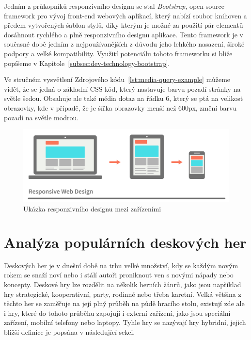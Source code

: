 Jedním z průkopníků responzivního designu se stal \textit{Bootstrap}, open-source framework pro vývoj front-end webových aplikací, který nabízí soubor knihoven a předem vytvořených šablon stylů, díky kterým je možné za použití pár elementů dosáhnout rychlého a plně responzivního designu aplikace. Tento framework je v současné době jedním z nejpoužívanějších z důvodu jeho lehkého nasazení, široké podpory a velké kompatibility. Využití potenciálu tohoto frameworku si blíže popíšeme v Kapitole~\ref{subsec:dev-technology-bootstrap}.



Ve stručném vysvětlení Zdrojového kódu~\ref{lst:media-query-example} můžeme vidět, že se jedná o základní CSS kód, který nastavuje barvu pozadí stránky na světle šedou. Obsahuje ale také média dotaz na řádku 6, který se ptá na velikost obrazovky, kde v případě, že je šířka obrazovky menší než 600px, změní barvu pozadí na světle modrou.

\begin{figure}[H]
    \centering
    \includegraphics[width=1.0\textwidth]{figures/responsiveDesign}
    \caption{Ukázka responzivního designu mezi zařízeními \cite{responsive_design}}
    \label{fig:responsive-design-example}
\end{figure}

\section{Analýza populárních deskových her}
\label{sec:popular-board-games-analysis}
Deskových her je v dnešní době na trhu velké množství, kdy se každým novým rokem se snaží noví nebo i stálí autoři proniknout ven s novými nápady nebo koncepty. Deskové hry lze rozdělit na několik herních žánrů, jako jsou například hry strategické, kooperativní, party, rodinné nebo třeba karetní. Velká většina z těchto her se zaměřuje na její plný průběh na půdě hracího stolu, existují zde ale i hry, které do tohoto průběhu zapojují i externí zařízení, jako jsou speciální zařízení, mobilní telefony nebo laptopy. Tyhle hry se nazývají hry hybridní, jejich bližší definice je popsána v následující sekci.

